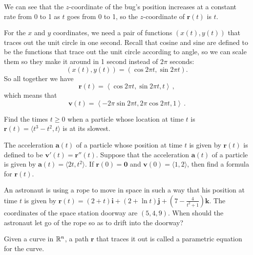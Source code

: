 \documentclass[prettycode,shellescape]{watsonbook}
\begin{document}
\begin{solution}
  We can see that the $z$-coordinate of the bug's position increases
  at a constant rate from 0 to 1 as $t$ goes from 0 to 1, so the
  $z$-coordinate of $\mathbf{r}(t)$ is $t$.

  For the $x$ and $y$ coordinates, we need a pair of functions
  $(x(t),y(t))$ that traces out the unit circle in one second. Recall
  that cosine and sine are defined to be the functions that trace out
  the unit circle according to angle, so we can scale them so they
  make it around in 1 second instead of $2\pi$ seconds:
  \[
    (x(t),y(t)) = \left( \cos 2\pi t, \sin 2\pi t
    \right). 
  \]
  So all together we have
  \[
    \boxed{\mathbf{r}(t) =  \left\langle \cos 2\pi t, \sin 2\pi t
        , t \right\rangle}\,, 
  \]
  which means that
  \[
    \boxed{\mathbf{v}(t) = \left\langle -2\pi \sin 2\pi t, 2\pi\cos 2\pi t
        , 1 \right\rangle}\,.
  \]
\end{solution}

\begin{exercise}{}{}
  Find the times $t \geq 0$ when a particle whose location at time $t$
  is $\mathbf{r}(t) = \langle t^3 - t^2, t\rangle$ is at its slowest.
\end{exercise}

\begin{exercise}{}{}
  The acceleration $\mathbf{a}(t)$ of a particle whose position at
  time $t$ is given by $\mathbf{r}(t)$ is defined to be
  $\mathbf{v}'(t) = \mathbf{r}''(t)$.  Suppose that the acceleration
  $\mathbf{a}(t)$ of a particle is given by
  $\mathbf{a}(t) = \langle 2t, t^2 \rangle$. If
  $\mathbf{r}(0) = \mathbf{0}$ and
  $\mathbf{v}(0) = \langle 1, 2 \rangle$, then find a formula for
  $\mathbf{r}(t)$.
\end{exercise}

\begin{exercise}{}{}
  An astronaut is using a rope to move in space in such a way that his
  position at time $t$ is given by 
  $\mathbf{r}(t) = (2+t) \mathbf{i} + (2+\ln t) \mathbf{j} + \left( 7
    - \frac{4}{t^2+1}\right) \mathbf{k}$. The coordinates of the space
  station doorway are $(5,4,9)$. When should the astronaut let go of the
  rope so as to drift into the doorway? 
\end{exercise}

Given a curve in $\mathbb{R}^n$, a path $\mathbf{r}$ that traces it out is
called a parametric equation for the curve. \enlargethispage{1cm} 
\end{document}
